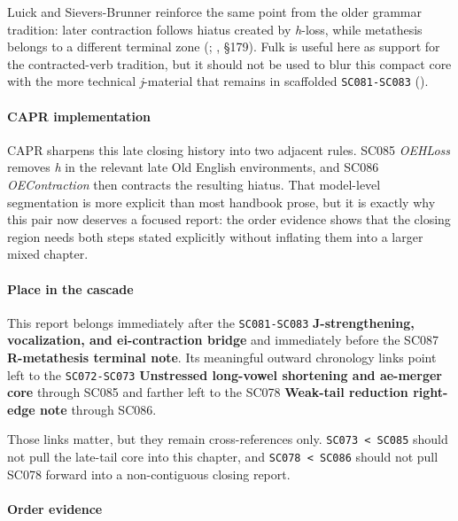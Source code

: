 \documentclass[
  british,
  a4paper,
]{article}
\begin{document}
Luick and Sievers-Brunner reinforce the same point from the older
grammar tradition: later contraction follows hiatus created by
\emph{h}-loss, while metathesis belongs to a different terminal zone
(;
, §179).
Fulk is useful here as support for the contracted-verb tradition, but it
should not be used to blur this compact core with the more technical
\emph{j}-material that remains in scaffolded \texttt{SC081-SC083}
().

\paragraph{CAPR implementation}\label{capr-implementation-51}

CAPR sharpens this late closing history into two adjacent rules. SC085
\emph{OEHLoss} removes \emph{h} in the relevant late Old English
environments, and SC086 \emph{OEContraction} then contracts the
resulting hiatus. That model-level segmentation is more explicit than
most handbook prose, but it is exactly why this pair now deserves a
focused report: the order evidence shows that the closing region needs
both steps stated explicitly without inflating them into a larger mixed
chapter.

\paragraph{Place in the cascade}\label{place-in-the-cascade-51}

This report belongs immediately after the \texttt{SC081-SC083}
\textbf{J-strengthening, vocalization, and ei-contraction bridge} and
immediately before the SC087 \textbf{R-metathesis terminal note}. Its
meaningful outward chronology links point left to the
\texttt{SC072-SC073} \textbf{Unstressed long-vowel shortening and
ae-merger core} through SC085 and farther left to the SC078
\textbf{Weak-tail reduction right-edge note} through SC086.

Those links matter, but they remain cross-references only.
\texttt{SC073\ \textless{}\ SC085} should not pull the late-tail core
into this chapter, and \texttt{SC078\ \textless{}\ SC086} should not
pull SC078 forward into a non-contiguous closing report.

\paragraph{Order evidence}\label{order-evidence-51}
\end{document}
